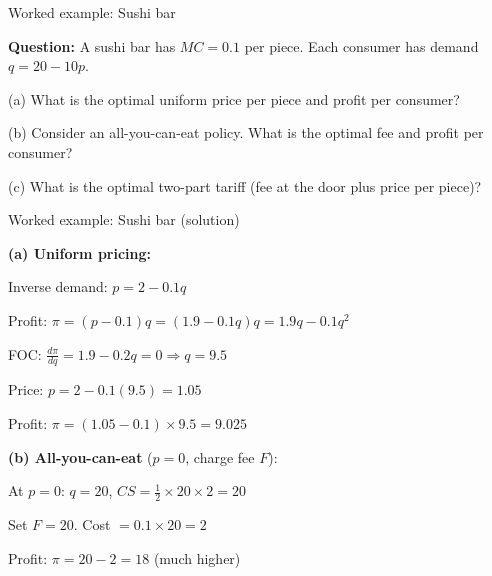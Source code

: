 \documentclass[notes,11pt, aspectratio=169]{beamer}
\newenvironment{wideitemize}{\itemize\addtolength{\itemsep}{10pt}}{\enditemize}
\begin{document}
\begin{frame}{Worked example: Sushi bar}
	\begin{wideitemize}
		\item \textbf{Question:} A sushi bar has $MC = 0.1$ per piece. Each consumer has demand $q = 20 - 10p$.
		\item (a) What is the optimal uniform price per piece and profit per consumer?
		\item (b) Consider an all-you-can-eat policy. What is the optimal fee and profit per consumer?
		\item (c) What is the optimal two-part tariff (fee at the door plus price per piece)?
	\end{wideitemize}
\end{frame}

\begin{frame}{Worked example: Sushi bar (solution)}
	\begin{wideitemize}
		\item \textbf{(a) Uniform pricing:}
		\begin{wideitemize}
			\vspace{3pt}
			\item Inverse demand: $p = 2 - 0.1q$
			\item Profit: $\pi = (p - 0.1)q = (1.9 - 0.1q)q = 1.9q - 0.1q^2$
			\item FOC: $\frac{d\pi}{dq} = 1.9 - 0.2q = 0 \Rightarrow q = 9.5$
			\item Price: $p = 2 - 0.1(9.5) = 1.05$
			\item Profit: $\pi = (1.05 - 0.1) \times 9.5 = 9.025$
		\end{wideitemize}
		\item \textbf{(b) All-you-can-eat} ($p = 0$, charge fee $F$):
		\begin{wideitemize}
			\vspace{3pt}
			\item At $p = 0$: $q = 20$, $CS = \frac{1}{2} \times 20 \times 2 = 20$
			\item Set $F = 20$. Cost $= 0.1 \times 20 = 2$
			\item Profit: $\pi = 20 - 2 = 18$ (much higher)
		\end{wideitemize}
	\end{wideitemize}
\end{frame}
\end{document}

